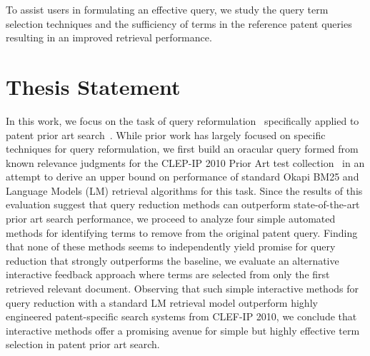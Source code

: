 To assist users in formulating an effective query, we study 
the query term selection techniques and the sufficiency of 
terms in the reference patent queries resulting in an improved 
retrieval performance.   

\section{Thesis Statement}
\label{sec:thesisstatement}
In this work, we focus on the task of query
reformulation~\citep{Baeza-Yates2011} specifically applied to patent
prior art
search~\citep{mahdabi2014patent,Piroi2010,xue2009transforming}.  While
prior work has largely focused on specific techniques for query
reformulation, 
 we first
build an oracular query formed from known relevance judgments for the
CLEP-IP 2010 Prior Art test collection~\citep{Piroi2010} in an attempt
to derive an upper bound on performance of standard Okapi BM25 and
Language Models (LM) retrieval algorithms for this task.  Since the
results of this evaluation suggest that query reduction methods can
outperform state-of-the-art prior art search performance, 
we proceed to analyze four simple
automated methods for identifying terms to remove from the original
patent query.  Finding that none of these methods seems to
independently yield promise for query reduction that strongly
outperforms the baseline, 
we evaluate an alternative
interactive feedback approach where terms are selected from only the
first retrieved relevant document.  Observing that such simple
interactive methods for query reduction with a standard LM retrieval
model outperform highly engineered patent-specific search systems from
CLEF-IP 2010, we conclude that interactive methods offer a promising
avenue for simple but highly effective term selection in patent prior
art search.


